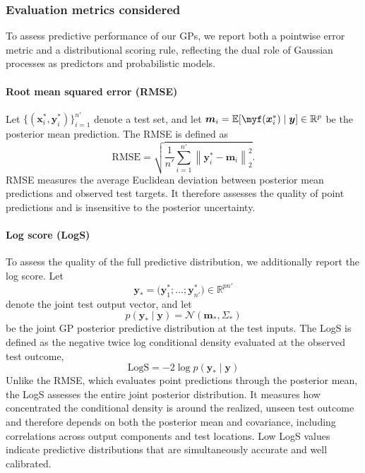 \documentclass[11pt,a4paper]{article}
\newcommand{\by}{\boldsymbol{y}}
\begin{document}
\subsubsection{Evaluation metrics considered}
\label{subsec:metrics}
To assess predictive performance of our GPs, we report both a pointwise error metric and a distributional scoring rule, reflecting the dual role of Gaussian processes as predictors and probabilistic models.
\paragraph{Root mean squared error (RMSE)}
Let $\{(\boldsymbol{x}_i^\ast,\boldsymbol{y}_i^\ast)\}_{i=1}^{n'}$ denote a test set, and let
$\boldsymbol{m}_i = \mathbb{E}[\myf(\boldsymbol{x}_i^\ast)\mid \by] \in \mathbb{R}^p$
be the posterior mean prediction.
The RMSE is defined as
\begin{equation}\label{eq:rmse} \mathrm{RMSE} =\sqrt{ \frac{1}{n'} \sum_{i=1}^{n'} \left\| \boldsymbol{y}_i^\ast - \boldsymbol{m}_i \right\|_2^2 }.\end{equation}
RMSE measures the average Euclidean deviation between posterior mean predictions and observed test targets.
It therefore assesses the quality of point predictions and is insensitive to the posterior uncertainty.

\paragraph{Log score (LogS)}
To assess the quality of the full predictive distribution, we additionally report the log score.
Let
\begin{equation*}\boldsymbol{y}_\ast = \bigl( \boldsymbol{y}_1^\ast;\dots;\boldsymbol{y}_{n'}^\ast \bigr) \in \mathbb{R}^{p n'}\end{equation*}
denote the joint test output vector, and let
\begin{equation*}p(\boldsymbol{y}_\ast \mid \by) = \mathcal{N}(\boldsymbol{m}_\ast,\Sigma_\ast)\end{equation*}
be the joint GP posterior predictive distribution at the test inputs.
The LogS is defined as the negative twice log conditional density evaluated at the observed test outcome,
\begin{equation}\label{eq:logs} \mathrm{LogS} = -2\log p(\boldsymbol{y}_\ast \mid \by)\end{equation}
Unlike the RMSE, which evaluates point predictions through the posterior mean, the LogS assesses the entire joint posterior distribution.
It measures how concentrated the conditional density is around the realized, unseen test outcome and therefore depends on both the posterior mean and covariance, including correlations across output components and test locations.
Low LogS values indicate predictive distributions that are simultaneously accurate and well calibrated.
\end{document}
